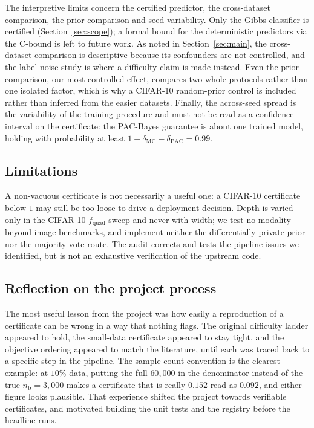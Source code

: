 The interpretive limits concern the certified predictor, the cross-dataset
comparison, the prior comparison and seed variability. Only the Gibbs classifier
is certified (Section~\ref{sec:scope}); a formal bound for the deterministic
predictors via the C-bound is left to future work. As noted in
Section~\ref{sec:main}, the cross-dataset comparison is descriptive because its
confounders are not controlled, and the label-noise study is where a difficulty
claim is made instead. Even the prior comparison, our most controlled effect, compares
two whole protocols rather than one isolated factor, which is why a CIFAR-10
random-prior control is included rather than inferred from the easier datasets.
Finally, the across-seed spread is the variability of the training procedure and
must not be read as a confidence interval on the certificate: the PAC-Bayes
guarantee is about one trained model, holding with probability at least
$1-\delta_{\mathrm{MC}}-\delta_{\mathrm{PAC}}=0.99$.

\subsection{Limitations}\label{sec:limitations}

A non-vacuous certificate is not necessarily a useful one: a CIFAR-10
certificate below $1$ may still be too loose to drive a deployment decision.
Depth is varied only in the CIFAR-10 $f_{\text{quad}}$ sweep and never with
width; we test no modality beyond image benchmarks, and implement neither the
differentially-private-prior nor the majority-vote route. The audit corrects and
tests the pipeline issues we identified, but is not an exhaustive verification of
the upstream code.

\subsection{Reflection on the project process}\label{sec:reflection}

The most useful lesson from the project was how easily a reproduction of a
certificate can be wrong in a way that nothing flags. The original difficulty
ladder appeared to hold, the small-data certificate appeared to stay tight, and
the objective ordering appeared to match the literature, until each was traced
back to a specific step in the pipeline. The sample-count convention is the
clearest example: at $10\%$ data, putting the full $60{,}000$ in the denominator
instead of the true $n_{\mathrm b}=3{,}000$ makes a certificate that is really
$0.152$ read as $0.092$, and either figure looks plausible. That
experience shifted the project towards verifiable certificates, and motivated
building the unit tests and the registry before the headline runs.

